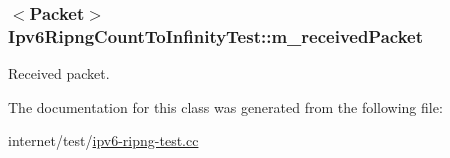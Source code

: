 \subsubsection[{\texorpdfstring{m\+\_\+received\+Packet}{m_receivedPacket}}]{$<${\bf Packet}$>$ Ipv6\+Ripng\+Count\+To\+Infinity\+Test\+::m\+\_\+received\+Packet\hspace{0.3cm}{\ttfamily [private]}}\hypertarget{classIpv6RipngCountToInfinityTest_ae1c66254eaebe5e4ce52c7c03fa2166a}{}\label{classIpv6RipngCountToInfinityTest_ae1c66254eaebe5e4ce52c7c03fa2166a}


Received packet. 



The documentation for this class was generated from the following file\+:\begin{DoxyCompactItemize}
\item 
internet/test/\hyperlink{ipv6-ripng-test_8cc}{ipv6-\/ripng-\/test.\+cc}\end{DoxyCompactItemize}
